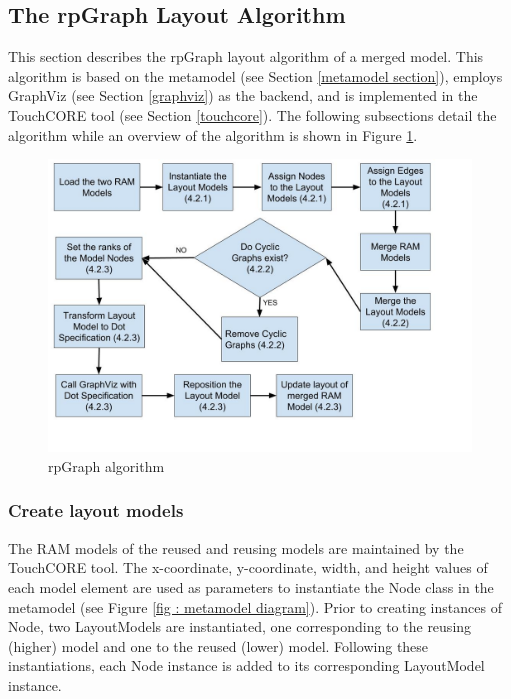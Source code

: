 \subsection{The rpGraph Layout Algorithm}\label{rpGraph algorithm}
This section describes the rpGraph layout algorithm of a merged model. This algorithm is based on the metamodel (see Section \ref{metamodel section}), employs GraphViz (see Section \ref{graphviz}) as the backend, and is implemented in the TouchCORE tool (see Section \ref{touchcore}). The following subsections detail the algorithm while an overview of the algorithm is shown in Figure \ref{fig :main algorithm}.

\begin{figure}
	\includegraphics[width=1\linewidth]{LayoutFlow.jpg}
	\caption{rpGraph algorithm}
	\label{fig :main algorithm}
\end{figure}

\subsubsection{Create layout models} \label{create layout model}
The RAM models of the reused and reusing models are maintained by the TouchCORE tool. The x-coordinate, y-coordinate, width, and height values of each model element are used as parameters to instantiate the Node class in the metamodel (see Figure \ref{fig : metamodel diagram}). Prior to creating instances of Node, two LayoutModels are instantiated, one corresponding to the reusing (higher) model and one to the reused (lower) model. Following these instantiations, each Node instance is added to its corresponding LayoutModel instance.

